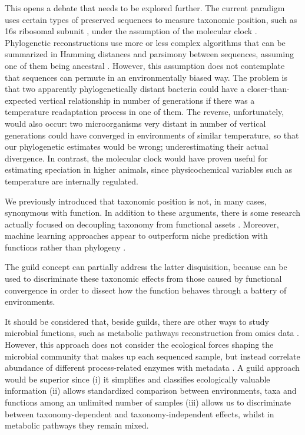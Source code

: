 \documentclass[Journal,letterpaper,NoLists]{ascelike-new}
\begin{document}
This opens a debate that needs to be explored further. The current paradigm uses certain types of preserved sequences to measure taxonomic position, such as 16s ribosomal subunit \cite{rajendhran2011microbial}, under the assumption of the molecular clock \cite{bromham2003modern}. Phylogenetic reconstructions use more or less complex algorithms that can be summarized in Hamming distances and parsimony between sequences, assuming one of them being ancestral \cite{bruyn2014phylogenetic}. However, this assumption does not contemplate that sequences can permute in an environmentally biased way. The problem is that two apparently phylogenetically distant bacteria could have a closer-than-expected vertical relationship in number of generations if there was a temperature readaptation process in one of them. The reverse, unfortunately, would also occur: two microorganisms very distant in number of vertical generations could have converged in environments of similar temperature, so that our phylogenetic estimates would be wrong; underestimating their actual divergence. In contrast, the molecular clock would have proven useful for estimating speciation in higher animals, since physicochemical variables such as temperature are internally regulated. 

We previously introduced that taxonomic position is not, in many cases, synonymous with function. In addition to these arguments, there is some research actually focused on decoupling taxonomy from functional assets \cite{louca2016decoupling}. Moreover, machine learning approaches appear to outperform niche prediction with functions rather than phylogeny \cite{alneberg2020ecosystem}.

The guild concept can partially address the latter disquisition, because can be used to discriminate these taxonomic effects from those caused by functional convergence in order to dissect how the function behaves through a battery of environments.

It should be considered that, beside guilds, there are other ways to study microbial functions, such as metabolic pathways reconstruction from omics data \cite{gianoulis2009quantifying}. However, this approach does not consider the ecological forces shaping the microbial community that makes up each sequenced sample, but instead correlate abundance of different process-related enzymes with metadata \cite{yang2021metagenomic}. A guild approach would be superior since (i) it simplifies and classifies ecologically valuable information (ii) allows standardized comparison between environments, taxa and functions among an unlimited number of samples (iii) allows us to discriminate between taxonomy-dependent and taxonomy-independent effects, whilst in metabolic pathways they remain mixed.
\end{document}
